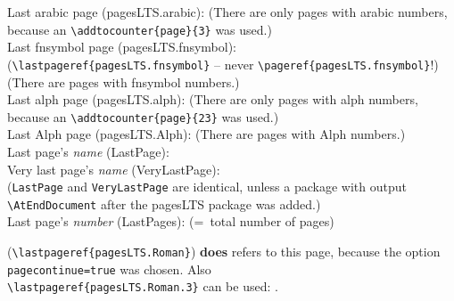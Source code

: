 \documentclass[british]{article}
\def\pagesLTSexampleArabic{3}
\def\pagesLTSexamplealph{23}
\begin{document}
\noindent Last arabic page (pagesLTS.arabic): 
(There are only  pages with arabic numbers,
because an \texttt{\textbackslash addtocounter\{page\}\{\pagesLTSexampleArabic\}} was used.)\\

\noindent Last fnsymbol page (pagesLTS.fnsymbol):  \\
(\texttt{\textbackslash lastpageref\{pagesLTS.fnsymbol\}} -- never
\texttt{\textbackslash pageref\{pagesLTS.fnsymbol\}}!)\\
(There are  pages with fnsymbol numbers.)\\

\noindent Last alph page (pagesLTS.alph): 
(There are only  pages with alph numbers,
because an \texttt{\textbackslash addtocounter\{page\}\{\pagesLTSexamplealph\}} was used.)\\

\noindent Last Alph page (pagesLTS.Alph): 
(There are  pages with Alph numbers.)\\

\noindent Last page's \textit{name} (LastPage): \\

\noindent Very last page's \textit{name} (VeryLastPage): \\
(\texttt{LastPage} and \texttt{VeryLastPage} are identical, unless
a package with output \linebreak
\texttt{\textbackslash AtEndDocument} after the \textsf{pagesLTS} package
was added.)\\

\noindent Last page's \textit{number} (LastPages): 
(=~total number of pages)\\

\lipsum[1-3]

\newpage

(\texttt{\textbackslash lastpageref\{pagesLTS.Roman\}})
\textbf{does} refers to this page, because the option
\texttt{pagecontinue=true} was chosen. Also\\
\texttt{\textbackslash lastpageref\{pagesLTS.Roman.3\}}
can be used: .\\
\end{document}
